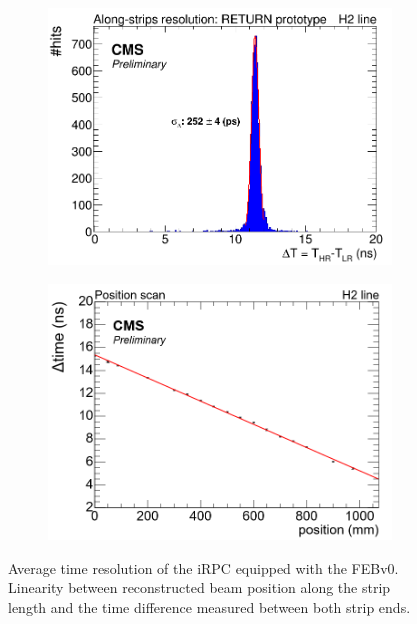 	\begin{figure}[H]
		\begin{subfigure}{.5\linewidth}
		    \centering
			\includegraphics[width = \linewidth]{fig/chapt6/iRPC-RPCROC-TimeResolution.png}
			\caption{\label{fig:RPCROCv0_Res:A}}
		\end{subfigure}
		\begin{subfigure}{.5\linewidth}
		    \centering
			\includegraphics[width = \linewidth]{fig/chapt6/iRPC-RPCROC-Linearity.png}
			\caption{\label{fig:RPCROCv0_Res:B}}
		\end{subfigure}
		\caption{\label{fig:RPCROCv0_Res}  Average time resolution of the iRPC equipped with the FEBv0.  Linearity between reconstructed beam position along the strip length and the time difference measured between both strip ends.}
    \end{figure}

